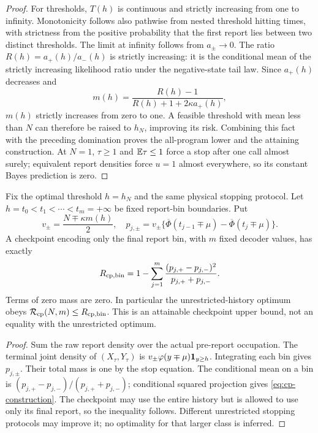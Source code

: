 \begin{proof}
For thresholds, $T(h)$ is continuous and strictly increasing from one to infinity. Monotonicity follows also pathwise from nested threshold hitting times, with strictness from the positive probability that the first report lies between two distinct thresholds. The limit at infinity follows from $a_\pm\to0$. The ratio $R(h)=a_+(h)/a_-(h)$ is strictly increasing: it is the conditional mean of the strictly increasing likelihood ratio under the negative-state tail law. Since $a_+(h)$ decreases and
\[
 m(h)=\frac{R(h)-1}{R(h)+1+2\kappa a_+(h)},
\]
$m(h)$ strictly increases from zero to one. A feasible threshold with mean less than $N$ can therefore be raised to $h_N$, improving its risk. Combining this fact with the preceding domination proves the all-program lower and the attaining construction. At $N=1$, $\tau\ge1$ and $\mathbb E\tau\le1$ force a stop after one call almost surely; equivalent report densities force $u=1$ almost everywhere, so its constant Bayes prediction is zero.
\end{proof}

\begin{proposition}\label{prop:gaussian-checkpoint}
Fix the optimal threshold $h=h_N$ and the same physical stopping protocol. Let $h=t_0<t_1<\cdots<t_m=+\infty$ be fixed report-bin boundaries. Put
\[
 v_\pm=\frac{N\mp\kappa m(h)}2,\quad
 p_{j,\pm}=v_\pm\{\overline\Phi(t_{j-1}\mp\mu)
                         -\overline\Phi(t_j\mp\mu)\}.
\]
A checkpoint encoding only the final report bin, with $m$ fixed decoder values, has exactly
\begin{equation}\label{eq:cp-construction}
 R_{\mathrm{cp},\mathrm{bin}}
 =1-\sum_{j=1}^m
        \frac{(p_{j,+}-p_{j,-})^2}{p_{j,+}+p_{j,-}}.
\end{equation}
Terms of zero mass are zero. In particular the unrestricted-history optimum obeys $\mathcal R_{\mathrm{cp}}(N,m)\le R_{\mathrm{cp},\mathrm{bin}}$. This is an attainable checkpoint upper bound, not an equality with the unrestricted optimum.
\end{proposition}
\begin{proof}
Sum the raw report density over the actual pre-report occupation. The terminal joint density of $(X_\tau,Y_\tau)$ is $v_\pm\varphi(y\mp\mu)\mathbf1_{y\ge h}$. Integrating each bin gives $p_{j,\pm}$. Their total mass is one by the stop equation. The conditional mean on a bin is $(p_{j,+}-p_{j,-})/(p_{j,+}+p_{j,-})$; conditional squared projection gives \eqref{eq:cp-construction}. The checkpoint may use the entire history but is allowed to use only its final report, so the inequality follows. Different unrestricted stopping protocols may improve it; no optimality for that larger class is inferred.
\end{proof}

